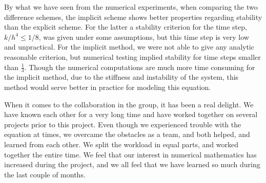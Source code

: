 By what we have seen from the numerical experiments, when comparing the two difference schemes, the implicit scheme shows better properties regarding stability than the explicit scheme. For the latter a stability criterion for the time step, $k/h^4 \le 1/8$, was given under some assumptions, but this time step is very low and unpractical. For the implicit method, we were not able to give any analytic reasonable criterion, but numerical testing implied stability for time steps smaller than $\frac{1}{3}$. Though the numerical computations are much more time consuming for the implicit method, due to the stiffness and instability of the system, this method would serve better in practice for modeling this equation.

When it comes to the collaboration in the group, it has been a real delight. We have known each other for a very long time and have worked together on several projects prior to this project. Even though we experienced trouble with the equation at times, we overcame the obstacles as a team, and both helped, and learned from each other. We split the workload in equal parts, and worked together the entire time. We feel that our interest in numerical mathematics has increased during the project, and we all feel that we have learned so much during the last couple of months.